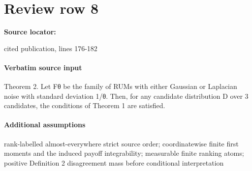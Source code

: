 \documentclass[10pt]{article}
\begin{document}
\section*{Review row 8}
\textbf{Source locator:} {\footnotesize\raggedright cited publication, lines 176-\allowbreak{}182\par}
\paragraph{Verbatim source input}
\begin{ReviewVerbatim}
Theorem 2. Let Fθ be the family of RUMs with either Gaussian or Laplacian noise with standard deviation
1/θ. Then, for any candidate distribution D over 3 candidates, the conditions of Theorem 1 are satisfied.
\end{ReviewVerbatim}

\paragraph{Additional assumptions}
\begin{sloppypar}
rank-labelled almost-everywhere strict source order; coordinatewise finite first moments and the induced payoff integrability; measurable finite ranking atoms; positive Definition 2 disagreement mass before conditional interpretation
\end{sloppypar}
\end{document}
